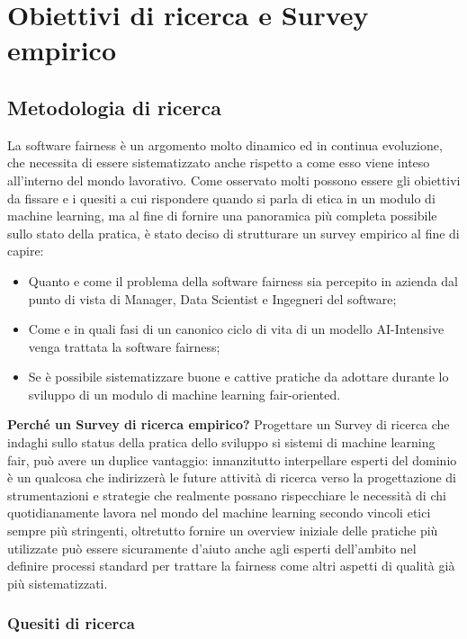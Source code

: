 \chapter{Obiettivi di ricerca e Survey empirico} %
%
    \section{Metodologia di ricerca}
    La software fairness è un argomento molto dinamico ed in continua evoluzione, che necessita di essere sistematizzato anche rispetto a come esso viene inteso all'interno del mondo lavorativo. Come osservato molti possono essere gli obiettivi da fissare e i quesiti a cui rispondere quando si parla di etica in un modulo di machine learning, ma al fine di fornire una panoramica più completa possibile sullo stato della pratica, è stato deciso di strutturare un survey empirico al fine di capire:
    \begin{itemize}
        \item Quanto e come il problema della software fairness sia percepito in azienda dal punto di vista di Manager, Data Scientist e Ingegneri del software;
        \item Come e in quali fasi di un canonico ciclo di vita di un modello AI-Intensive venga trattata la software fairness;
        \item Se è possibile sistematizzare buone e cattive pratiche da adottare durante lo sviluppo di un modulo di machine learning fair-oriented.
    \end{itemize}
    
    \textbf{Perché un Survey di ricerca empirico?}
    Progettare un Survey di ricerca che indaghi sullo status della pratica dello sviluppo si sistemi di machine learning fair, può avere un duplice vantaggio: innanzitutto interpellare esperti del dominio è un qualcosa che indirizzerà le future attività di ricerca verso la progettazione di strumentazioni e strategie che realmente possano rispecchiare le necessità di chi quotidianamente lavora nel mondo del machine learning secondo vincoli etici sempre più stringenti, oltretutto fornire un overview iniziale delle pratiche più utilizzate può essere sicuramente d'aiuto anche agli esperti dell'ambito nel definire processi standard per trattare la fairness come altri aspetti di qualità già più sistematizzati.
    \subsection{Quesiti di ricerca}
    
